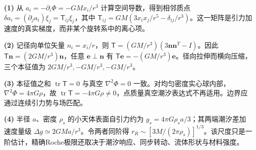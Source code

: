 \par\noindent\textbf{(1)} 从 \(a_i=-\partial_i\Phi=-GMx_i/r^3\) 计算空间导数，得到相邻质点 \(\delta a_i=(\partial_ja_i)\xi_j=\mathsf T_{ij}\xi_j\)，其中 \(\mathsf T_{ij}=GM(3x_ix_j/r^5-\delta_{ij}/r^3)\)。这一矩阵是引力加速度的真实梯度，而非某个旋转系中的离心项。
\par\noindent\textbf{(2)} 记径向单位矢量 \(n_i=x_i/r\)，则 \(\mathsf T=(GM/r^3)(3\boldsymbol n\boldsymbol n^T-I)\)。因此 \(\mathsf T\boldsymbol n=(2GM/r^3)\boldsymbol n\)，任意 \(\boldsymbol e\perp\boldsymbol n\) 有 \(\mathsf T\boldsymbol e=-(GM/r^3)\boldsymbol e\)。径向拉伸而横向压缩，三个本征值为 \(2GM/r^3,-GM/r^3,-GM/r^3\)。
\par\noindent\textbf{(3)} 本征值之和 \(\operatorname{tr}\mathsf T=0\) 与真空 \(\nabla^2\Phi=0\) 一致。对均匀密度实心球内部，\(\nabla^2\Phi=4\pi G\rho\)，故 \(\operatorname{tr}\mathsf T=-4\pi G\rho\ne0\)，点质量真空潮汐表达式不再适用。边界应通过连续引力势与场匹配。
\par\noindent\textbf{(4)} 半径 \(a\)、密度 \(\rho_s\) 的小天体表面自引力约为 \(g_s=4\pi G\rho_s a/3\)；其两端潮汐差加速度量级 \(\Delta g\simeq2GM a/r^3\)。令两者同阶得 \(r_R\sim[3M/(2\pi\rho_s)]^{1/3}\)。该尺度只是一阶估计，精确Roche极限还取决于潮汐响应、同步转动、流体形状与材料强度。
